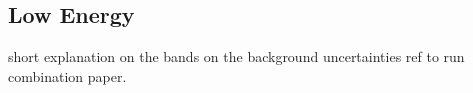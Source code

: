 
\subsection{Low Energy}
\label{subsec:LowE}
short explanation on the bands on the background  uncertainties ref to run combination paper.

